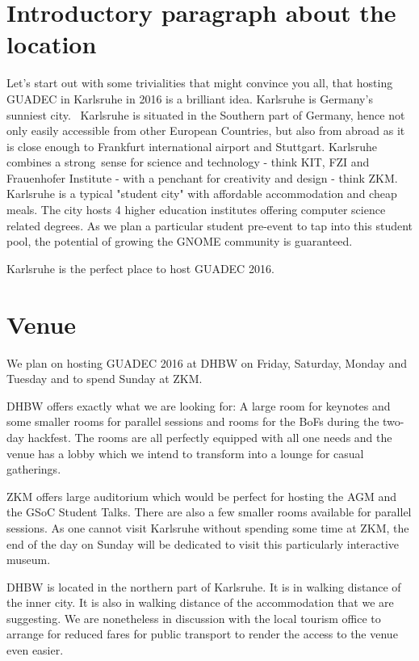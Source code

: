 \section{Introductory paragraph about the location}

Let's start out with some trivialities that might convince you all, that hosting GUADEC in Karlsruhe in 2016 is a brilliant idea. Karlsruhe is Germany's sunniest city.  Karlsruhe is situated in the Southern part of Germany, hence not only easily accessible from other European Countries, but also from abroad as it is close enough to Frankfurt international airport and Stuttgart. Karlsruhe combines a strong sense for science and technology - think KIT, FZI and Frauenhofer Institute - with a penchant for creativity and design - think ZKM. Karlsruhe is a typical "student city" with affordable accommodation and cheap meals. The city hosts 4 higher education institutes offering computer science related degrees. As we plan a particular student pre-event to tap into this student pool, the potential of growing the GNOME community is guaranteed.  

Karlsruhe is the perfect place to host GUADEC 2016. 

\section{Venue}


We plan on hosting GUADEC 2016 at DHBW on Friday, Saturday, Monday and Tuesday and to spend Sunday at ZKM.

DHBW offers exactly what we are looking for: A large room for keynotes and some smaller rooms for parallel sessions and rooms for the BoFs during the two-day hackfest. The rooms are all perfectly equipped with all one needs and the venue has a lobby which we intend to transform into a lounge for casual gatherings. 

ZKM offers large auditorium which would be perfect for hosting the AGM and the GSoC Student Talks. There are also a few smaller rooms available for parallel sessions. As one cannot visit Karlsruhe without spending some time at ZKM, the end of the day on Sunday will be dedicated to visit this particularly interactive museum.

DHBW is located in the northern part of Karlsruhe. It is in walking distance of the inner city. It is also in walking distance of the accommodation that we are suggesting. We are nonetheless in discussion with the local tourism office to arrange for reduced fares for public transport to render the access to the venue even easier. 

